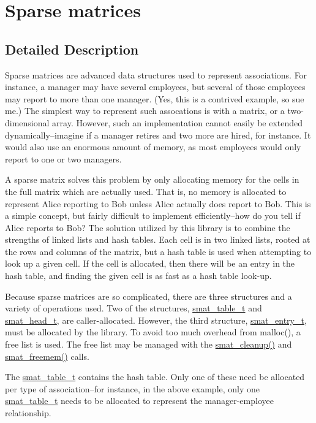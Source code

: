 \hypertarget{group__dbprim__smat}{
\section{Sparse matrices}
\label{group__dbprim__smat}
}


\subsection{Detailed Description}
Sparse matrices are advanced data structures used to represent associations. For instance, a manager may have several employees, but several of those employees may report to more than one manager. (Yes, this is a contrived example, so sue me.) The simplest way to represent such assocations is with a matrix, or a two-dimensional array. However, such an implementation cannot easily be extended dynamically--imagine if a manager retires and two more are hired, for instance. It would also use an enormous amount of memory, as most employees would only report to one or two managers.

A sparse matrix solves this problem by only allocating memory for the cells in the full matrix which are actually used. That is, no memory is allocated to represent Alice reporting to Bob unless Alice actually does report to Bob. This is a simple concept, but fairly difficult to implement efficiently--how do you tell if Alice reports to Bob? The solution utilized by this library is to combine the strengths of linked lists and hash tables. Each cell is in two linked lists, rooted at the rows and columns of the matrix, but a hash table is used when attempting to look up a given cell. If the cell is allocated, then there will be an entry in the hash table, and finding the given cell is as fast as a hash table look-up.

Because sparse matrices are so complicated, there are three structures and a variety of operations used. Two of the structures, \hyperlink{group__dbprim__smat_ga0}{smat\_\-table\_\-t} and \hyperlink{group__dbprim__smat_ga1}{smat\_\-head\_\-t}, are caller-allocated. However, the third structure, \hyperlink{group__dbprim__smat_ga2}{smat\_\-entry\_\-t}, must be allocated by the library. To avoid too much overhead from malloc(), a free list is used. The free list may be managed with the \hyperlink{group__dbprim__smat_ga8}{smat\_\-cleanup()} and \hyperlink{group__dbprim__smat_ga9}{smat\_\-freemem()} calls.

The \hyperlink{group__dbprim__smat_ga0}{smat\_\-table\_\-t} contains the hash table. Only one of these need be allocated per type of association--for instance, in the above example, only one \hyperlink{group__dbprim__smat_ga0}{smat\_\-table\_\-t} needs to be allocated to represent the manager-employee relationship.

